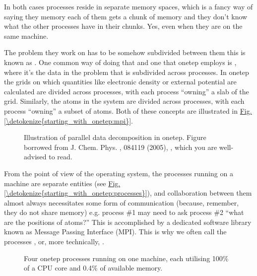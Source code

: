 \documentclass[letterpaper,10pt,english]{sphinxmanual}
\begin{document}
In both cases processes reside in separate memory spaces, which is a
fancy way of saying they  memory \textendash{} each of them gets a
chunk of memory and they don’t know what the other processes have in
their chunks. Yes, even when they are on the same machine.

The problem they work on has to be somehow subdivided between them \textendash{}
this is known as . One common way of doing that
\textendash{} and one that onetep employs \textendash{} is , where it’s the
data in the problem that is subdivided across processes. In onetep the
grids on which quantities like electronic density or external potential
are calculated are divided across processes, with each process “owning”
a slab of the grid. Similarly, the atoms in the system are divided
across processes, with each process “owning” a subset of atoms. Both of
these concepts are illustrated in \hyperref[\detokenize{starting_with_onetep:mpi}]{Fig.\@ \ref{\detokenize{starting_with_onetep:mpi}}}.

\begin{figure}[htbp]
\centering
\capstart

\noindent{}
\caption{Illustration of parallel data decomposition in onetep. Figure borrowed from J. Chem. Phys. , 084119 (2005), , which you are well-advised to read.}\label{\detokenize{starting_with_onetep:mpi}}\label{\detokenize{starting_with_onetep:id3}}\end{figure}

From the point of view of the operating system, the processes running on
a machine are separate entities (see \hyperref[\detokenize{starting_with_onetep:processes}]{Fig.\@ \ref{\detokenize{starting_with_onetep:processes}}}), and
collaboration between them almost always necessitates some form of
communication (because, remember, they do not share memory) \textendash{} e.g.
process \#1 may need to ask process \#2 “what are the positions of 
atoms?” This is accomplished by a dedicated software library known as
Message Passing Interface (MPI). This is why we often call the processes
, or, more technically, .

\begin{figure}[htbp]
\centering
\capstart

\noindent{}
\caption{Four onetep processes running on one machine, each utilising 100\% of a CPU core and 0.4\% of available memory.}\label{\detokenize{starting_with_onetep:processes}}\label{\detokenize{starting_with_onetep:id4}}\end{figure}
\end{document}
